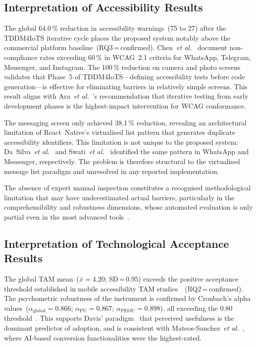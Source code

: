 \documentclass[journal]{IEEEtran}
\begin{document}
	\subsection{Interpretation of Accessibility Results}
	The global 64.0\,\% reduction in accessibility
	warnings~(75 to 27) after the TDDM4IoTS iterative cycle places
	the proposed system notably above the commercial platform
	baseline~(RQ3\,=\,confirmed).
	Chen~\textit{et al.}~\cite{chen2022} document non-compliance
	rates exceeding 60\,\% in WCAG~2.1 criteria for WhatsApp,
	Telegram, Messenger, and Instagram.
	The 100\,\% reduction on camera and photo screens validates
	that Phase~5 of TDDM4IoTS---defining accessibility tests before
	code generation---is effective for eliminating barriers in
	relatively simple screens.
	This result aligns with
	Ara~\textit{et al.}~\cite{ara2024}'s recommendation that
	iterative testing from early development phases is the
	highest-impact intervention for WCAG conformance.
	
	The messaging screen only achieved 38.1\,\% reduction, revealing
	an architectural limitation of React~Native's virtualised list
	pattern that generates duplicate accessibility identifiers.
	This limitation is not unique to the proposed system:
	Da~Silva~\textit{et al.}~\cite{dasilva2016} and
	Swati~\textit{et al.}~\cite{swati2021} identified the same
	pattern in WhatsApp and Messenger, respectively.
	The problem is therefore structural to the virtualised message
	list paradigm and unresolved in any reported implementation.
	
	The absence of expert manual inspection constitutes a recognised
	methodological limitation that may have underestimated actual
	barriers, particularly in the comprehensibility and robustness
	dimensions, whose automated evaluation is only partial even in
	the most advanced tools~\cite{ara2024}.
	
	\subsection{Interpretation of Technological Acceptance Results}
	The global TAM mean~($\bar{x}{=}4.20$; SD\,=\,0.95)
	exceeds the positive acceptance threshold established in mobile
	accessibility TAM studies~\cite{julianto2023}~(RQ2\,=\,confirmed).
	The psychometric robustness of the instrument is confirmed by
	Cronbach's alpha values~($\alpha_{\text{global}}{=}0.866$;
	$\alpha_{\text{PU}}{=}0.867$; $\alpha_{\text{PEOU}}{=}0.898$),
	all exceeding the 0.80 threshold~\cite{nunnally1978}.
	This supports Davis' paradigm~\cite{davis1989} that perceived
	usefulness is the dominant predictor of adoption, and is
	consistent with Mateos-Sanchez~\textit{et al.}~\cite{mateos2022},
	where AI-based conversion functionalities were the highest-rated.
	
\end{document}
